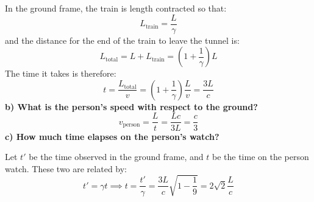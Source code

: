 \documentclass[9pt]{report}
\begin{document}
\begin{enumerate}
    In the ground frame, the train is length contracted so that:
    \[
      L_\text{train} = \frac{L}{\gamma}
    \]
    and the distance for the end of the train to leave the tunnel
    is:
    \[
      L_\text{total} = L + L_\text{train} = (1 + \frac{1}{\gamma})L
    \]
    The time it takes is therefore:
    \[
      t = \frac{L_\text{total}}{v} = (1 + \frac{1}{\gamma}) \frac{L}{v} = \frac{3L}{c} 
    \]
    \textbf{b) What is the person's speed with respect to the ground?}
    \[
      v_\text{person} = \frac{L}{t} = \frac{Lc}{3L} = \frac{c}{3}
    \]
    \textbf{c) How much time elapses on the person's watch?}

    Let $t'$ be the time observed in the ground frame, and $t$ be the time on
    the person watch. These two are related by:
    \[
      t' = \gamma t \implies t = \frac{t'}{\gamma} = \frac{3L}{c}\sqrt{1-\frac{1}{9}} = 2\sqrt{2}\frac{L}{c}
    \]
\end{enumerate}
\end{document}
